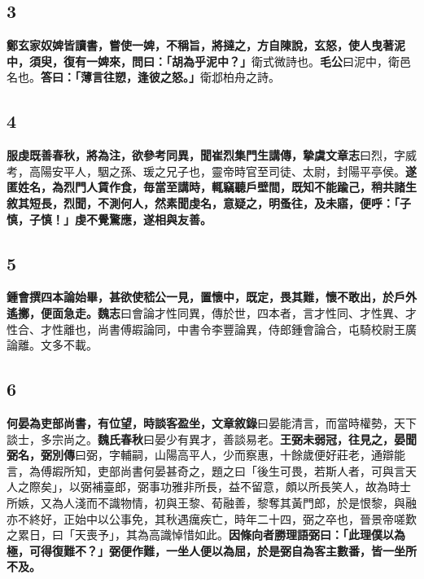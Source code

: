 \subsection*{3}

\textbf{鄭玄家奴婢皆讀書，嘗使一婢，不稱旨，將撻之，方自陳說，玄怒，使人曳著泥中，須臾，復有一婢來，問曰：「胡為乎泥中？」}{\footnotesize 衛式微詩也。\textbf{毛公}曰泥中，衛邑名也。}\textbf{答曰：「薄言往愬，逢彼之怒。」}{\footnotesize 衛邶柏舟之詩。}

\subsection*{4}

\textbf{服虔既善春秋，將為注，欲參考同異，聞崔烈集門生講傳，}{\footnotesize \textbf{摯虞文章志}曰烈，字威考，高陽安平人，駰之孫、瑗之兄子也，靈帝時官至司徒、太尉，封陽平亭侯。}\textbf{遂匿姓名，為烈門人賃作食，毎當至講時，輒竊聽戶壁間，既知不能踰己，稍共諸生敘其短長，烈聞，不測何人，然素聞虔名，意疑之，明蚤往，及未寤，便呼：「子慎，子慎！」虔不覺驚應，遂相與友善。}

\subsection*{5}

\textbf{鍾會撰四本論始畢，甚欲使嵇公一見，置懷中，既定，畏其難，懷不敢出，於戶外遙擲，便面急走。}{\footnotesize \textbf{魏志}曰會論才性同異，傳於世，四本者，言才性同、才性異、才性合、才性離也，尚書傅嘏論同，中書令李豐論異，侍郎鍾會論合，屯騎校尉王廣論離。文多不載。}

\subsection*{6}

\textbf{何晏為吏部尚書，有位望，時談客盈坐，}{\footnotesize \textbf{文章敘錄}曰晏能清言，而當時權勢，天下談士，多宗尚之。\textbf{魏氏春秋}曰晏少有異才，善談易老。}\textbf{王弼未弱冠，往見之，晏聞弼名，}{\footnotesize \textbf{弼別傳}曰弼，字輔嗣，山陽高平人，少而察惠，十餘歲便好莊老，通辯能言，為傅嘏所知，吏部尚書何晏甚奇之，題之曰「後生可畏，若斯人者，可與言天人之際矣」，以弼補臺郎，弼事功雅非所長，益不留意，頗以所長笑人，故為時士所嫉，又為人淺而不識物情，初與王黎、荀融善，黎奪其黃門郎，於是恨黎，與融亦不終好，正始中以公事免，其秋遇癘疾亡，時年二十四，弼之卒也，晉景帝嗟歎之累日，曰「天喪予」，其為高識悼惜如此。}\textbf{因條向者勝理語弼曰：「此理僕以為極，可得復難不？」弼便作難，一坐人便以為屈，於是弼自為客主數番，皆一坐所不及。}

